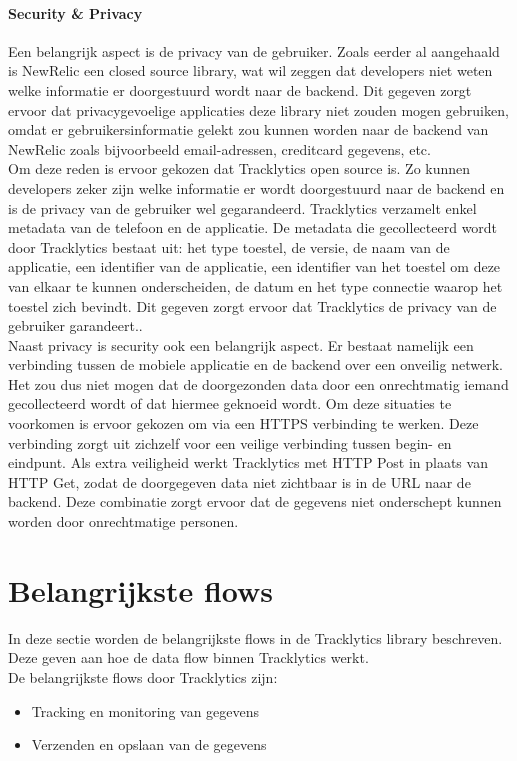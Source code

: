 \paragraph{Security \& Privacy}
Een belangrijk aspect is de privacy van de gebruiker. Zoals eerder al aangehaald is NewRelic een closed source library, wat wil zeggen dat developers niet weten welke informatie er doorgestuurd wordt naar de backend. Dit gegeven zorgt ervoor dat privacygevoelige applicaties deze library niet zouden mogen gebruiken, omdat er gebruikersinformatie gelekt zou kunnen worden naar de backend van NewRelic zoals bijvoorbeeld email-adressen, creditcard gegevens, etc.\\
Om deze reden is ervoor gekozen dat Tracklytics open source is. Zo kunnen developers zeker zijn welke informatie er wordt doorgestuurd naar de backend en is de privacy van de gebruiker wel gegarandeerd. Tracklytics verzamelt enkel metadata van de telefoon en de applicatie. De metadata die gecollecteerd wordt door Tracklytics bestaat uit: het type toestel, de versie, de naam van de applicatie, een identifier van de applicatie, een identifier van het toestel om deze van elkaar te kunnen onderscheiden, de datum en het type connectie waarop het toestel zich bevindt. Dit gegeven zorgt ervoor dat Tracklytics de privacy van de gebruiker garandeert..\\

Naast privacy is security ook een belangrijk aspect. Er bestaat namelijk een verbinding tussen de mobiele applicatie en de backend over een onveilig netwerk. Het zou dus niet mogen dat de doorgezonden data door een onrechtmatig iemand gecollecteerd wordt of dat hiermee geknoeid wordt. Om deze situaties te voorkomen is ervoor gekozen om via een HTTPS verbinding te werken. Deze verbinding zorgt uit zichzelf voor een veilige verbinding tussen begin- en eindpunt. Als extra veiligheid werkt Tracklytics met HTTP Post in plaats van HTTP Get, zodat de doorgegeven data niet zichtbaar is in de URL naar de backend. Deze combinatie zorgt ervoor dat de gegevens niet onderschept kunnen worden door onrechtmatige personen. 

\section{Belangrijkste flows}
In deze sectie worden de belangrijkste flows in de Tracklytics library beschreven. Deze geven aan hoe de data flow binnen Tracklytics werkt.\\
De belangrijkste flows door Tracklytics zijn:
\begin{itemize}
\item Tracking en monitoring van gegevens
\item Verzenden en opslaan van de gegevens
\end{itemize} 


